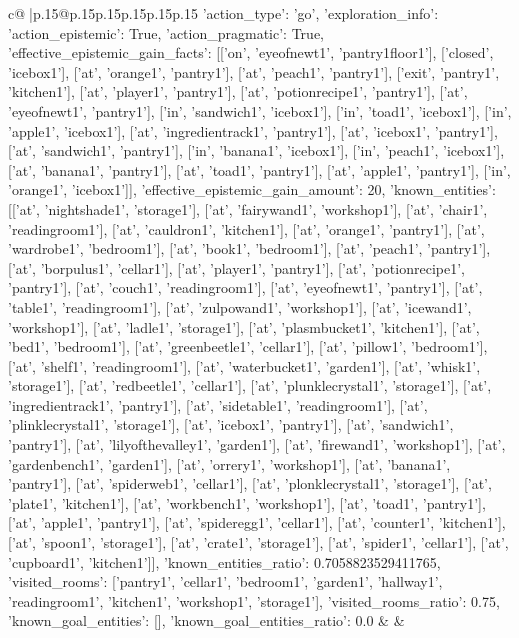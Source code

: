 \documentclass{article}
\begin{document}
{\begin{supertabular}{c@{$\;$}|p{.15\linewidth}@{}p{.15\linewidth}p{.15\linewidth}p{.15\linewidth}p{.15\linewidth}p{.15\linewidth}}
{{{	 {'action_type': 'go', 'exploration_info': {'action_epistemic': True, 'action_pragmatic': True, 'effective_epistemic_gain_facts': [['on', 'eyeofnewt1', 'pantry1floor1'], ['closed', 'icebox1'], ['at', 'orange1', 'pantry1'], ['at', 'peach1', 'pantry1'], ['exit', 'pantry1', 'kitchen1'], ['at', 'player1', 'pantry1'], ['at', 'potionrecipe1', 'pantry1'], ['at', 'eyeofnewt1', 'pantry1'], ['in', 'sandwich1', 'icebox1'], ['in', 'toad1', 'icebox1'], ['in', 'apple1', 'icebox1'], ['at', 'ingredientrack1', 'pantry1'], ['at', 'icebox1', 'pantry1'], ['at', 'sandwich1', 'pantry1'], ['in', 'banana1', 'icebox1'], ['in', 'peach1', 'icebox1'], ['at', 'banana1', 'pantry1'], ['at', 'toad1', 'pantry1'], ['at', 'apple1', 'pantry1'], ['in', 'orange1', 'icebox1']], 'effective_epistemic_gain_amount': 20, 'known_entities': [['at', 'nightshade1', 'storage1'], ['at', 'fairywand1', 'workshop1'], ['at', 'chair1', 'readingroom1'], ['at', 'cauldron1', 'kitchen1'], ['at', 'orange1', 'pantry1'], ['at', 'wardrobe1', 'bedroom1'], ['at', 'book1', 'bedroom1'], ['at', 'peach1', 'pantry1'], ['at', 'borpulus1', 'cellar1'], ['at', 'player1', 'pantry1'], ['at', 'potionrecipe1', 'pantry1'], ['at', 'couch1', 'readingroom1'], ['at', 'eyeofnewt1', 'pantry1'], ['at', 'table1', 'readingroom1'], ['at', 'zulpowand1', 'workshop1'], ['at', 'icewand1', 'workshop1'], ['at', 'ladle1', 'storage1'], ['at', 'plasmbucket1', 'kitchen1'], ['at', 'bed1', 'bedroom1'], ['at', 'greenbeetle1', 'cellar1'], ['at', 'pillow1', 'bedroom1'], ['at', 'shelf1', 'readingroom1'], ['at', 'waterbucket1', 'garden1'], ['at', 'whisk1', 'storage1'], ['at', 'redbeetle1', 'cellar1'], ['at', 'plunklecrystal1', 'storage1'], ['at', 'ingredientrack1', 'pantry1'], ['at', 'sidetable1', 'readingroom1'], ['at', 'plinklecrystal1', 'storage1'], ['at', 'icebox1', 'pantry1'], ['at', 'sandwich1', 'pantry1'], ['at', 'lilyofthevalley1', 'garden1'], ['at', 'firewand1', 'workshop1'], ['at', 'gardenbench1', 'garden1'], ['at', 'orrery1', 'workshop1'], ['at', 'banana1', 'pantry1'], ['at', 'spiderweb1', 'cellar1'], ['at', 'plonklecrystal1', 'storage1'], ['at', 'plate1', 'kitchen1'], ['at', 'workbench1', 'workshop1'], ['at', 'toad1', 'pantry1'], ['at', 'apple1', 'pantry1'], ['at', 'spideregg1', 'cellar1'], ['at', 'counter1', 'kitchen1'], ['at', 'spoon1', 'storage1'], ['at', 'crate1', 'storage1'], ['at', 'spider1', 'cellar1'], ['at', 'cupboard1', 'kitchen1']], 'known_entities_ratio': 0.7058823529411765, 'visited_rooms': ['pantry1', 'cellar1', 'bedroom1', 'garden1', 'hallway1', 'readingroom1', 'kitchen1', 'workshop1', 'storage1'], 'visited_rooms_ratio': 0.75, 'known_goal_entities': [], 'known_goal_entities_ratio': 0.0}} 
	  } 
	   } 
	   } 
	 & & \\ 
 


\end{supertabular}}
\end{document}
